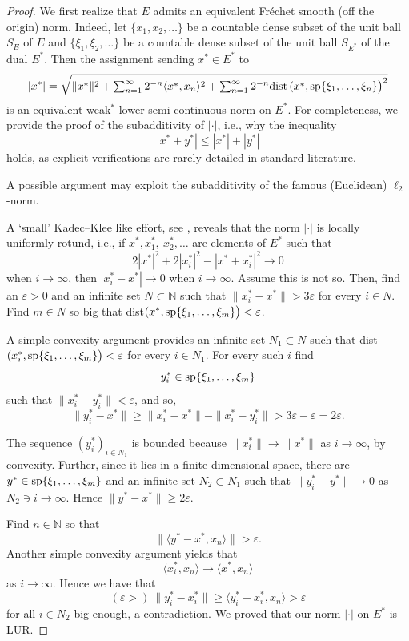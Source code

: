 \documentclass[12pt]{amsart}
\theoremstyle{plain}
\theoremstyle{definition}
\theoremstyle{remark}
\def\ee{\varepsilon}
\def\N{{\mathbb N}}
\def\ee{\varepsilon}
\def\ee{\varepsilon}
\begin{document}
\begin{proof} We first realize that $E$ admits an equivalent Fr\'echet smooth (off the origin) norm. Indeed,
let $\{x_1, x_2,\ldots\}$ be a countable dense subset of the unit ball $S_E$ of $E$ and $\{\xi_1, \xi_2, \ldots\}$ be a countable dense subset of the unit ball $S_{E^*}$ of the dual $E^*$. Then the assignment sending $x^*\in E^*$ to
$$
|x^*|=\sqrt{\|x^*\|^2 + \hbox{$\sum_{n=1}^\infty 2^{-n}$}\langle x^*,x_n\rangle^2+\hbox{$\sum_{n=1}^\infty 2^{-n}$}{\rm dist}\, (x^*,{\rm sp}\{\xi_1,\ldots,\xi_n\}\big)^2}
$$
is an equivalent weak$^*$ lower semi-continuous norm on $E^*$. For completeness, we provide the proof of the subadditivity of $|\cdot|$, i.e., why the inequality $$|x^*+y^*| \le |x^*|+|y^*|$$ holds,
as explicit verifications are rarely detailed in standard literature.

A possible argument may exploit the subadditivity of the famous (Euclidean) $\ell_2$-norm.

A `small' Kadec--Klee like effort, see \cite[p. 113-117]{d}, reveals that
the norm $|\cdot|$ is locally uniformly rotund, i.e., if $x^*, x^*_1,\ x^*_2,\ldots$ are elements of $E^*$ such that
$$2|x^*|^2+2|x_i^*|^2-|x^*+x^*_i|^2\to0$$ when $i\to\infty$, then $|x^*_i-x^*|\to 0$ when $i\to\infty$.
Assume this is not so. Then, find an $\ee>0$ and an infinite set $N\subset \N$ such that $\|x^*_i-x^*\| > 3\ee$
for every $i\in N$.
Find $m\in N$ so big that dist$(x^*,{\rm sp}\{\xi_1,\ldots,\xi_m\}\big)<\ee$.

A simple convexity argument provides an infinite set $N_1\subset N$ such that
dist$(x^*_i,{\rm sp}\{\xi_1,\ldots,\xi_m\}\big)<\ee$ for every $i\in N_1$. For every such $i$  find
$$y^*_i\in {\rm sp}\{\xi_1,\ldots,\xi_m\}$$ such that $\|x^*_i-y^*_i\|<\ee$, and so,
$$
\|y^*_i-x^*\| \ge \|x^*_i-x^*\| - \|x^*_i-y^*_i\| > 3\ee -\ee=2\ee.
$$

The sequence $(y^*_i)_{i\in N_1}$ is bounded
because $\|x^*_i\|\to\|x^*\|$ as $i\to\infty$, by convexity. Further, since it lies in a finite-dimensional space, there are $y^*\in {\rm sp}\{\xi_1,\ldots,\xi_m\}$ and an infinite set
$N_2\subset N_1$ such that $\|y^*_i-y^*\|\to0$ as $N_2\ni i\to\infty$.
Hence $\|y^*-x^*\|\ge 2\ee.$

Find $n\in\N$ so that $$\|\langle y^*-x^*,x_n\rangle\| >\ee.$$
Another  simple convexity argument yields that $$\langle x^*_i,x_{n}\rangle \to \langle x^*,x_{n}\rangle$$ as $i\to\infty.$
Hence we have that
$$
(\ee>)\ \| y^*_i-x^*_i\| \ge  \langle y^*_i-x^*_i, x_{n}\rangle> \ee
$$
for all $i\in N_2$ big enough, a contradiction. We proved that our norm $|\cdot|$ on $E^*$ is LUR.


\end{proof}
\end{document}
